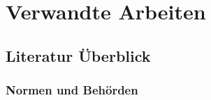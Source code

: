 \part{Verwandte Arbeiten}
\newcommand{\ann}[3]{\textit{Kernaussage:} #1 \quad \textit{Relevanz:} #2 \quad \textit{Grenzen:} #3}

\chapter{Literatur Überblick}

\section{Normen und Behörden}
